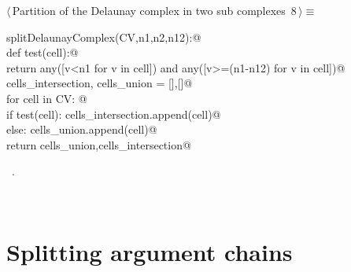 \documentclass[11pt,oneside]{article}	%
\begin{document}
\begin{flushleft} \small
\begin{minipage}{\linewidth} \label{scrap13}
\protect{}$\langle\,$Partition of the Delaunay complex in two sub complexes\nobreak\ {\footnotesize 8}$\,\rangle\equiv$
\vspace{-1ex}
\begin{list}{}{} \item
\mbox{}\verb@def splitDelaunayComplex(CV,n1,n2,n12):@\\
\mbox{}\verb@   def test(cell):@\\
\mbox{}\verb@      return any([v<n1 for v in cell]) and any([v>=(n1-n12) for v in cell])@\\
\mbox{}\verb@   cells_intersection, cells_union = [],[]@\\
\mbox{}\verb@   for cell in CV: @\\
\mbox{}\verb@      if test(cell): cells_intersection.append(cell)@\\
\mbox{}\verb@      else: cells_union.append(cell)@\\
\mbox{}\verb@   return cells_union,cells_intersection@\\
\mbox{}\verb@@{\NWsep}
\end{list}
\vspace{-1ex}
\footnotesize\addtolength{\baselineskip}{-1ex}
\begin{list}{}{\setlength{\itemsep}{-\parsep}\setlength{\itemindent}{-\leftmargin}}
\item \NWtxtMacroRefIn\ .
\end{list}
\end{minipage}\\[4ex]
\end{flushleft}


\section{Splitting argument chains}
\end{document}
